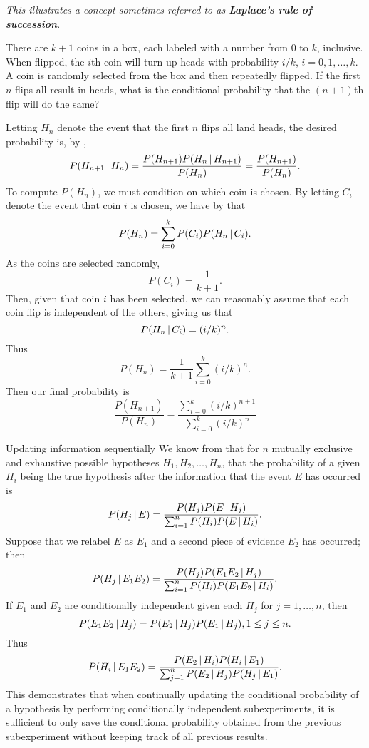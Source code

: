 \begin{changebar}
    \begin{example}
        \emph{This illustrates a concept sometimes referred to as \textbf{Laplace's rule of succession}}.

        There are $k+1$ coins in a box, each labeled with a number from $0$ to $k$, inclusive. When flipped, the $i$th coin will turn up heads with probability $i/k$, $i = 0, 1, \dots, k$. A coin is randomly selected from the box and then repeatedly flipped. If the first $n$ flips all result in heads, what is the conditional probability that the $(n + 1)$th flip will do the same?
    \end{example}
    \begin{solution}
        Letting $H_n$ denote the event that the first $n$ flips all land heads, the desired probability is, by , \[
            P(H_{n+1} \,\vert\, H_n) = \frac{P(H_{n+1})P(H_n \,\vert\, H_{n+1})}{P(H_n)} = \frac{P(H_{n+1})}{P(H_n)}.
        \] To compute $P(H_n)$, we must condition on which coin is chosen. By letting $C_i$ denote the event that coin $i$ is chosen, we have by  that \[
            P(H_n) = \sum^{k}_{i = 0}P(C_i)P(H_n \,\vert\, C_i).
        \] As the coins are selected randomly, \[
            P(C_i) = \frac{1}{k + 1}.    
        \] Then, given that coin $i$ has been selected, we can reasonably assume that each coin flip is independent of the others, giving us that \[
            P(H_n \,\vert\, C_i) = (i/k)^n.    
        \] Thus \[
            P(H_n) = \frac{1}{k+1}\sum^k_{i = 0}(i/k)^n.    
        \] Then our final probability is \[
            \frac{P(H_{n+1})}{P(H_n)} = \frac{\sum^k_{i = 0}(i/k)^{n+1}}{\sum^k_{i=0}(i/k)^n}
        \]
    \end{solution}
\end{changebar}
\begin{bdef}{Updating information sequentially}\label{sequentialupdate}
    We know from  that for $n$ mutually exclusive and exhaustive possible hypotheses $H_1, H_2, \dots, H_n$, that the probability of a given $H_i$ being the true hypothesis after the information that the event $E$ has occurred is \[
        P(H_j \,\vert\, E) = \frac{P(H_j)P(E \,\vert\, H_j)}{\sum^n_{i = 1} P(H_i)P(E \,\vert\, H_i)}.    
    \] Suppose that we relabel $E$ as $E_1$ and a second piece of evidence $E_2$ has occurred; then \[
        P(H_j \,\vert\, E_1E_2) = \frac{P(H_j)P(E_1E_2 \,\vert\, H_j)}{\sum^n_{i = 1} P(H_i)P(E_1E_2 \,\vert\, H_i)}.    
    \] If $E_1$ and $E_2$ are conditionally independent given each $H_j$ for $j = 1,\dots, n$, then \[
        P(E_1E_2 \,\vert\, H_j) = P(E_2 \,\vert\, H_j)P(E_1 \,\vert\, H_j), 1 \leq j \leq n.     
    \] Thus \[
        P(H_i \,\vert\, E_1E_2) = \frac{P(E_2 \,\vert\, H_i)P(H_i \,\vert\, E_1)}{\sum^n_{j = 1}P(E_2 \,\vert\, H_j)P(H_j \,\vert\, E_1)}.    
    \] This demonstrates that when continually updating the conditional probability of a hypothesis by performing conditionally independent subexperiments, it is sufficient to only save the conditional probability obtained from the previous subexperiment without keeping track of all previous results.
\end{bdef}